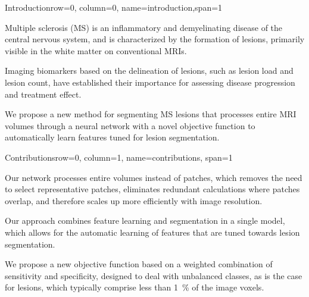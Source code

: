 \documentclass[%
portrait,paperwidth=841mm,paperheight=1180mm,%
margin=2cm,
fontscale=0.32
]{baposter}
\begin{document}
\begin{poster}

% 
% 


\begin{headerblock}{Introduction}{row=0, column=0, name=introduction,span=1}
\begin{compactitem}
\item Multiple sclerosis (MS) is an inflammatory and demyelinating disease of
the central nervous system, and is characterized by the formation of lesions,
primarily visible in the white matter on conventional MRIs.
\item Imaging biomarkers based on the delineation of lesions, such as lesion
load and lesion count, have established their importance for assessing disease
progression and treatment effect.
\item We propose a new method for segmenting MS lesions that processes entire
MRI volumes through a neural network with a novel objective function
to automatically learn features tuned for lesion segmentation. 
\end{compactitem}
\end{headerblock}


\begin{headerblock}{Contributions}{row=0, column=1, name=contributions,
span=1}
\begin{compactitem}
\item Our network processes entire volumes instead of patches, which removes the
need to select representative patches, eliminates redundant calculations where
patches overlap, and therefore scales up more efficiently with image resolution.
\item Our approach combines feature learning and segmentation in a single model,
which allows for the automatic learning of features that are tuned towards lesion
segmentation.
\item We propose a new objective function based on a weighted combination of
sensitivity and specificity, designed to deal with unbalanced classes, as is the
case for lesions, which typically comprise less than \SI{1}{\percent} of the
image voxels.
\end{compactitem}
\end{headerblock}


\end{poster}
\end{document}
